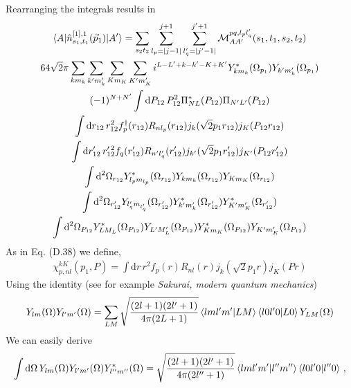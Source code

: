 \documentclass[10pt]{article}
\begin{document}
Rearranging the integrals results in
\begin{multline*}
\braket{ A | \hat{n}^{[1],1}_{s_1,t_1}(\vec{p}_1) | A'} = \sum_{s_2 t_2}  \sum_{l_p = |j-1|}^{j+1} \sum_{l_q' = |j' - 1|}^{j'+1} \mathcal{M}_{AA'}^{p q,l_p l_q'}(s_1,t_1,s_2,t_2) \\
64 \sqrt{2} \pi \sum_{k m_k} \sum_{k' m_k'} \sum_{K m_K} \sum_{K' m_K'} i^{L-L'+k-k'-K+K'} Y_{k m_k}^{*}(\Omega_{p_1}) Y_{k' m_k'}(\Omega_{p_1}) \\
 (-1)^{N+N'}\int \text{d} P_{12} \, P_{12}^{2} \Pi_{N L}^{*}(P_{12}) \Pi_{N' L'}(P_{12})\\
 \int \text{d} r_{12}\, r_{12}^{2} f_{p}^{\dagger}(r_{12}) R_{n l_p}(r_{12}) j_{k}( \sqrt{2} p_1 r_{12})  j_{K}(P_{12} r_{12}) \\
\int \text{d} r_{12}' \, r_{12}^{\prime \, 2} f_{q}(r_{12}')  R_{n' l_q'}(r_{12}') j_{k'}( \sqrt{2} p_1 r_{12}')  j_{K'}(P_{12} r_{12}') \\
 \int \text{d}^{2} \Omega_{r_{12}}  Y_{l_p m_{l_p} }^{*}(\Omega_{r_{12}}) Y_{k m_k}(\Omega_{r_{12}}) Y_{K m_K}(\Omega_{r_{12}}) \\
 \int \text{d}^{2} \Omega_{r_{12}'}  Y_{ l_q' m_{l_q'} }(\Omega_{r_{12}'})  Y_{k' m_k'}^{*}(\Omega_{r_{12}'}) Y_{K' m_K'}^{*}(\Omega_{r_{12}'}) \\
   \int \text{d}^{2} \Omega_{P_{12}}  Y_{L M_L}^{*}(\Omega_{P_{12}})  Y_{L' M_L'}(\Omega_{P_{12}}) Y_{K m_K}^{*}(\Omega_{P_{12}}) Y_{K' m_K'}(\Omega_{P_{12}})
\end{multline*}
As in Eq. (D.38) we define,
\begin{align}\label{eq:chi}
	\chi_{p,nl}^{kK}(p_1,P) = \int \text{d} r\, r^{2} f_{p}(r) R_{n l}(r) j_{k}( \sqrt{2} p_1 r)  j_{K}(P r)
\end{align}
Using the identity (see for example \textit{Sakurai, modern quantum mechanics})
\begin{align*}
	Y_{ l m }(\Omega) Y_{ l' m'}(\Omega) = \sum_{LM} \sqrt{ \frac{(2l+1)(2l'+1)}{4 \pi (2L+1)}} \braket{ l m l' m' | L M} \braket{ l 0 l' 0 | L 0 } Y_{L M}(\Omega)
\end{align*}
We can easily derive
\begin{align*}
	\int \text{d} \Omega \, Y_{ l m }(\Omega) Y_{ l' m'}(\Omega) Y_{ l'' m''}^{*}(\Omega) = \sqrt{ \frac{(2l+1)(2l'+1)}{4 \pi (2l''+1)}} \braket{ l m l' m' | l'' m''} \braket{ l 0 l' 0 | l'' 0 } \, ,
\end{align*}
\end{document}
